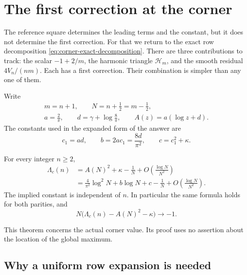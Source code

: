 \section{The first correction at the corner}\label{sec:asym}

The reference square determines the leading terms and the constant,
but it does not determine the first correction.  For that we return to
the exact row decomposition \eqref{eq:corner-exact-decomposition}.
There are three contributions to track: the scalar $-1+2/m$, the
harmonic triangle $\mathcal H_m$, and the smooth residual $4V_n/(nm)$.
Each has a first correction.  Their combination is simpler than any
one of them.

Write
\begin{equation}\label{eq:asym-normalization}
 \begin{gathered}
 m=n+1,\qquad N=n+\tfrac12=m-\tfrac12,\\
 a=\frac2\pi,\qquad d=\gamma+\log\frac8\pi,\qquad
 A(z)=a(\log z+d).
 \end{gathered}
\end{equation}
The constants used in the expanded form of the answer are
\begin{equation}\label{eq:asym-coefficients}
 c_1=ad,\qquad b=2ac_1=\frac{8d}{\pi^2},\qquad
 c=c_1^2+\kappa.
\end{equation}

\begin{theorem}\label{thm:corner-expansion}
For every integer $n\geq2$,
\begin{align}
 \Lambda_c(n)&=A(N)^2+\kappa-\frac1N
                  +O\!\left(\frac{\log N}{N^2}\right)
                  \label{eq:asym-sharp-square}\\
 &=\frac4{\pi^2}\log^2N+b\log N+c-\frac1N
                  +O\!\left(\frac{\log N}{N^2}\right).
                  \label{eq:asym-sharp-expanded}
\end{align}
The implied constant is independent of $n$.  In particular the same
formula holds for both parities, and
\begin{equation}\label{eq:asym-reciprocal-limit}
 N\bigl(\Lambda_c(n)-A(N)^2-\kappa\bigr)\longrightarrow-1.
\end{equation}
\end{theorem}

This theorem concerns the actual corner value.  Its proof uses no
assertion about the location of the global maximum.

\subsection{Why a uniform row expansion is needed}

